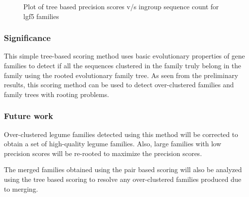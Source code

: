 \documentclass{article}
\begin{document}
		\begin{figure}[h!]
			\caption{Plot of tree based precision scores v/s ingroup sequence count for lgf5 families}
			\label{fig:scatter_tree_precision_vs_seqct_lgf5}
		\end{figure}
		
		\subsubsection{Significance}
		This simple tree-based scoring method uses basic evolutionary properties of gene families to detect if all the sequences clustered in the family truly belong in the family using the rooted evolutionary family tree. As seen from the preliminary results, this scoring method can be used to detect over-clustered families and family trees with rooting problems.
		
		
		\subsubsection{Future work}
		Over-clustered legume families detected using this method will be corrected to obtain a set of high-quality legume families. Also, large families with low precision scores will be re-rooted to maximize the precision scores.
		
		The merged families obtained using the pair based scoring will also be analyzed using the tree based scoring to resolve any over-clustered families produced due to merging.
		
\end{document}
